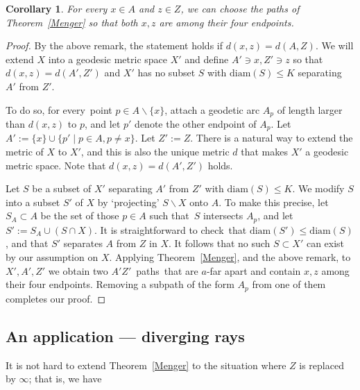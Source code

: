 \documentclass[a4paper]{article}
\newtheorem{corollary}[proposition]{Corollary}
\newcommand{\sm}{\backslash}
\newcommand{\pths}[2]{\ensuremath{#1}\text{--}\ensuremath{#2}~paths}
\newcommand{\Tr}[1]{Theorem~\ref{#1}}
\newcommand{\fe}{for every}
\newcommand{\st}{such that}
\newcommand{\istc}{is straightforward to check}
\newcommand{\diam}{\mathrm{diam}}
\begin{document}
\begin{corollary} \label{endpoints}
For every $x\in A$ and $z\in Z$, we can choose the paths of \Tr{Menger} so that both $x,z$ are among their four endpoints.
\end{corollary}
\begin{proof}
By the above remark, the statement holds if $d(x,z)= d(A,Z)$. We will extend $X$ into a geodesic metric space $X'$ and define $A'\ni x, Z' \ni z$ so that $d(x,z)= d(A',Z')$ and $X'$ has no subset $S$ with $\diam(S)\leq K$ separating $A'$ from $Z'$.             

To do so, \fe\ point $p \in A \sm \{x\}$, attach a geodetic arc $A_p$ of length  larger than $d(x,z)$ to $p$, and let $p'$ denote the other endpoint of $A_p$. Let $A':= \{x\} \cup \{p' \mid p \in A, p\neq x\}$. Let $Z':= Z$. There is a natural way to extend the metric of $X$ to $X'$, and this is also the unique metric $d$ that makes $X'$ a geodesic metric space. Note that $d(x,z)= d(A',Z')$ holds.

Let $S$ be a subset of $X'$ separating $A'$ from $Z'$ with $\diam(S)\leq K$. We modify $S$ into a subset $S'$ of $X$ by `projecting' $S \sm X$ onto $A$. To make this precise, let $S_A \subset A$ be the set of those $p\in A$ \st\  $S$ intersects $A_p$, and let $S':= S_A \cup (S\cap X)$. It \istc\ that $\diam(S')\leq  \diam(S)$, and that $S'$ separates $A$ from $Z$ in $X$. It follows that no such $S \subset X'$ can exist by our assumption on $X$. Applying \Tr{Menger}, and the above remark, to $X',A',Z'$ we obtain two \pths{A'}{Z'}\ that are $a$-far apart and contain $x,z$ among their four endpoints. Removing a subpath of the form $A_p$ from one of them completes our proof.
\end{proof}

\subsection{An application --- diverging rays} \label{sec div rays}

It is not hard to extend \Tr{Menger} to the situation where $Z$ is replaced by $\infty$; that is, we have
\end{document}

